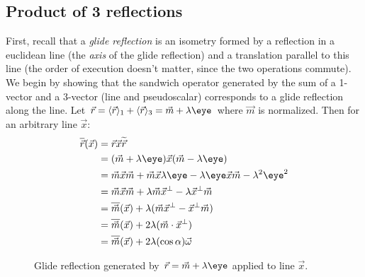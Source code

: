 \documentclass[12pt]{article}
\begin{document}
{\subsection{Product of 3 reflections}
First, recall that a \emph{glide reflection} is an isometry formed by a reflection in a euclidean line (the \emph{axis} of the glide reflection) and a translation parallel to this line (the order of execution doesn't matter, since the two operations commute).
We begin by showing that the sandwich operator generated by the sum of a 1-vector and a 3-vector (line and pseudoscalar) corresponds to a glide reflection along the line.  Let $\vec{r} = \langle \vec{r} \rangle_{1} + \langle \vec{r} \rangle_{3} =\vec{m}  + \lambda \eye$ where $\vec{m}$ is normalized. Then for an arbitrary line $\vec{x}$:
\begin{align*}
\overline{\vec{r}}(\vec{x}) &= \vec{r} \vec{x} \widetilde{\vec{r}} \\
&= (\vec{m} + \lambda \eye) \vec{x} (\vec{m} - \lambda \eye) \\
&= \vec{m} \vec{x} \vec{m} + \vec{m}\vec{x}\lambda \eye - \lambda \eye \vec{x} \vec{m} - \lambda^{2}\eye^{2}\\
&= \vec{m} \vec{x} \vec{m} + \lambda \vec{m} \vec{x}^{\perp} - \lambda \vec{x}^{\perp} \vec{m} \\
&= \overline{ \vec{m}}(\vec{x}) + \lambda(\vec{m}\vec{x}^{\perp} - \vec{x}^{\perp}\vec{m})\\
&= \overline{ \vec{m}}(\vec{x}) + 2 \lambda(\vec{m} \cdot \vec{x}^{\perp}) \\
&=  \overline{ \vec{m}}(\vec{x})  + 2 \lambda (\cos{\alpha})\vec{\omega} 
\end{align*}
\begin{figure}
  \centering
    \setlength\fboxsep{0pt}
  \caption{Glide reflection generated by $\vec{r} = \vec{m} + \lambda \eye$ applied to line $\vec{x}$.}

\end{figure}}
\end{document}
